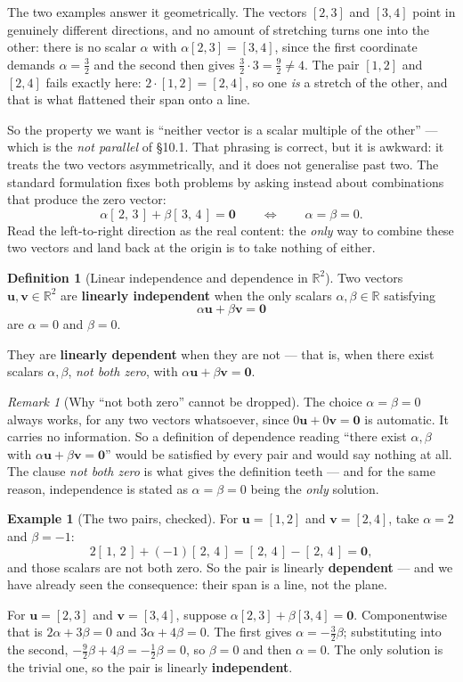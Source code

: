 \documentclass[11pt]{article}
\theoremstyle{definition}
\newtheorem{defn}{Definition}[section]
\newtheorem{ex}{Example}[section]
\theoremstyle{remark}
\newtheorem*{rmk}{Remark}
\newcommand{\R}{\mathbb{R}}
\newcommand{\vc}[1]{\mathbf{#1}}
\begin{document}
The two examples answer it geometrically. The vectors $[2,3]$ and $[3,4]$ point
in genuinely different directions, and no amount of stretching turns one into
the other: there is no scalar $\alpha$ with $\alpha[2,3]=[3,4]$, since the first
coordinate demands $\alpha=\tfrac32$ and the second then gives
$\tfrac32\cdot3=\tfrac92\neq4$. The pair $[1,2]$ and $[2,4]$ fails exactly here:
$2\cdot[1,2]=[2,4]$, so one \emph{is} a stretch of the other, and that is what
flattened their span onto a line.

So the property we want is ``neither vector is a scalar multiple of the other''
--- which is the \emph{not parallel} of \S10.1. That phrasing is correct, but it
is awkward: it treats the two vectors asymmetrically, and it does not generalise
past two. The standard formulation fixes both problems by asking instead about
combinations that produce the zero vector:
\[
  \alpha[\,2,\,3\,] + \beta[\,3,\,4\,] = \vc{0}
  \qquad\Longleftrightarrow\qquad
  \alpha=\beta=0 .
\]
Read the left-to-right direction as the real content: the \emph{only} way to
combine these two vectors and land back at the origin is to take nothing of
either.

\begin{defn}[Linear independence and dependence in $\R^{2}$]
Two vectors $\vc{u},\vc{v}\in\R^{2}$ are \textbf{linearly independent} when the
only scalars $\alpha,\beta\in\R$ satisfying
\[
  \alpha\vc{u} + \beta\vc{v} = \vc{0}
\]
are $\alpha=0$ and $\beta=0$.

They are \textbf{linearly dependent} when they are not --- that is, when there
exist scalars $\alpha,\beta$, \emph{not both zero}, with
$\alpha\vc{u}+\beta\vc{v}=\vc{0}$.
\end{defn}

\begin{rmk}[Why ``not both zero'' cannot be dropped]
The choice $\alpha=\beta=0$ always works, for any two vectors whatsoever, since
$0\vc{u}+0\vc{v}=\vc{0}$ is automatic. It carries no information. So a
definition of dependence reading ``there exist $\alpha,\beta$ with
$\alpha\vc{u}+\beta\vc{v}=\vc{0}$'' would be satisfied by every pair and would
say nothing at all. The clause \emph{not both zero} is what gives the definition
teeth --- and for the same reason, independence is stated as
$\alpha=\beta=0$ being the \emph{only} solution.
\end{rmk}

\begin{ex}[The two pairs, checked]
For $\vc{u}=[1,2]$ and $\vc{v}=[2,4]$, take $\alpha=2$ and $\beta=-1$:
\[
  2[\,1,\,2\,] + (-1)[\,2,\,4\,] = [\,2,\,4\,] - [\,2,\,4\,] = \vc{0} ,
\]
and those scalars are not both zero. So the pair is linearly
\textbf{dependent} --- and we have already seen the consequence: their span is a
line, not the plane.

For $\vc{u}=[2,3]$ and $\vc{v}=[3,4]$, suppose
$\alpha[2,3]+\beta[3,4]=\vc{0}$. Componentwise that is $2\alpha+3\beta=0$ and
$3\alpha+4\beta=0$. The first gives $\alpha=-\tfrac32\beta$; substituting into
the second, $-\tfrac92\beta+4\beta=-\tfrac12\beta=0$, so $\beta=0$ and then
$\alpha=0$. The only solution is the trivial one, so the pair is linearly
\textbf{independent}.
\end{ex}
\end{document}
